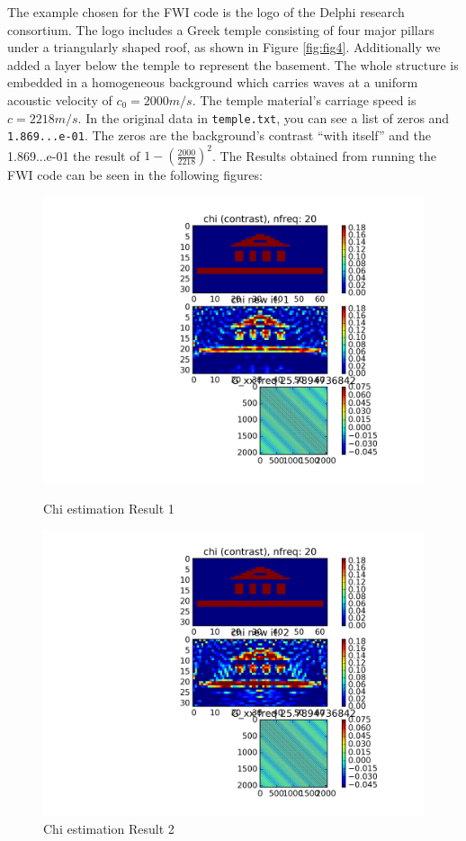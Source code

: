 \documentclass[10pt,a4paper]{article}
\begin{document}
The example chosen for the FWI code is the logo of the Delphi
research consortium. The logo includes a
Greek temple consisting of four major
pillars under a triangularly shaped roof, as shown in Figure \ref{fig:fig4}.
Additionally we added a layer below the temple to represent the
basement. The whole structure is embedded in a homogeneous background
which carries waves at a
uniform acoustic velocity of
$c_0 = 2000 m/s$.
The temple material's carriage speed is $c = 2218 m/s$.
In the original data in \texttt{temple.txt}, you can see a list of
zeros and \texttt{1.869...e-01}. The zeros are the background's
contrast ``with itself'' and the 1.869...e-01 the result of $1-
{(\frac{2000}{2218})}^2$.
The Results obtained from running the FWI code can be seen in the
following figures:
\begin{figure}
\centering
 \includegraphics[scale=0.75]{Chi_est_it00.png}
  \caption{Chi estimation Result 1}
  \label{fig:fig4}
 \includegraphics[scale=0.75]{Chi_est_it01.png}
  \caption{Chi estimation Result 2}
  \label{fig:fig5}
\end{figure}
\end{document}
